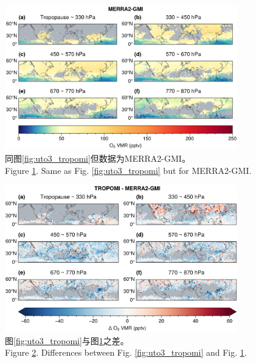 \begin{figure}[H]
    \centering
    \includegraphics[width=0.9\textwidth]{./figures/uto3_merra2-gmi.png}
    \caption{
    同图\ref{fig:uto3_tropomi}但数据为MERRA2-GMI。 \\
    Figure \ref{fig:uto3_merra2}. Same as Fig. \ref{fig:uto3_tropomi} but for MERRA2-GMI.
    }
    \label{fig:uto3_merra2}
\end{figure}


\begin{figure}[H]
    \centering
    \includegraphics[width=0.9\textwidth]{./figures/uto3_delta.png}
    \caption{
    图\ref{fig:uto3_tropomi}与图\ref{fig:uto3_merra2}之差。 \\
    Figure \ref{fig:uto3_delta}. Differences between Fig. \ref{fig:uto3_tropomi} and Fig. \ref{fig:uto3_merra2}.
    }
    \label{fig:uto3_delta}
\end{figure}


